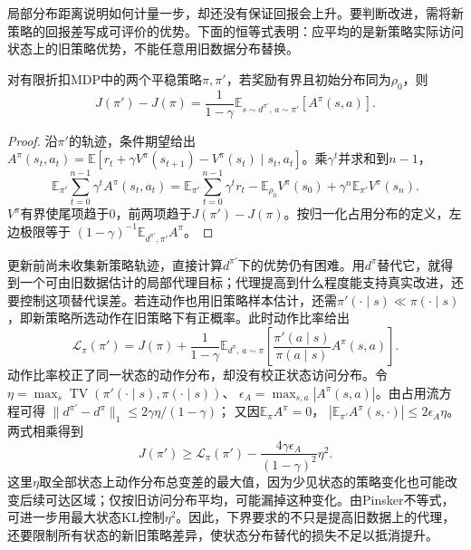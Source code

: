 局部分布距离说明如何计量一步，却还没有保证回报会上升。要判断改进，需将新策略的回报差写成可评价的优势。下面的恒等式表明：应平均的是新策略实际访问状态上的旧策略优势，不能任意用旧数据分布替换。

\begin{theorem}[折扣性能差恒等式]
  \label{thm:rl-learning-performance-difference}
  对有限折扣MDP中的两个平稳策略$\pi,\pi'$，若奖励有界且初始分布同为$\rho_0$，则
  \begin{equation}
    J(\pi')-J(\pi)
       =\frac{1}{1-\gamma}
          \mathbb E_{s\sim d^{\pi'},\,a\sim\pi'}[A^\pi(s,a)].
    \label{eq:rl-learning-performance-difference}
  \end{equation}
\end{theorem}
\begin{proof}
  沿$\pi'$的轨迹，条件期望给出
  $A^\pi(s_t,a_t)
    =\mathbb E[r_t+\gamma V^\pi(s_{t+1})-V^\pi(s_t)
                \mid s_t,a_t]$。乘$\gamma^t$并求和到$n-1$，
  \[
    \mathbb E_{\pi'}\sum_{t=0}^{n-1}\gamma^t A^\pi(s_t,a_t)
      =\mathbb E_{\pi'}\sum_{t=0}^{n-1}\gamma^t r_t
         -\mathbb E_{\rho_0}V^\pi(s_0)
         +\gamma^n\mathbb E_{\pi'}V^\pi(s_n).
  \]
  $V^\pi$有界使尾项趋于0，前两项趋于$J(\pi')-J(\pi)$。按归一化占用分布的定义，左边极限等于
  $(1-\gamma)^{-1}\mathbb E_{d^{\pi'},\pi'}A^\pi$。
\end{proof}

更新前尚未收集新策略轨迹，直接计算$d^{\pi'}$下的优势仍有困难。用$d^\pi$替代它，就得到一个可由旧数据估计的局部代理目标；代理提高到什么程度能支持真实改进，还要控制这项替代误差。若连动作也用旧策略样本估计，还需$\pi'(\cdot\mid s)\ll\pi(\cdot\mid s)$，即新策略所选动作在旧策略下有正概率。此时动作比率给出
\[
  \mathcal L_\pi(\pi')
    =J(\pi)+\frac1{1-\gamma}
         \mathbb E_{d^\pi,\,a\sim\pi}
           \left[\frac{\pi'(a\mid s)}{\pi(a\mid s)}
                         A^\pi(s,a)\right].
\]
动作比率校正了同一状态的动作分布，却没有校正状态访问分布。令
$\eta=\max_s\operatorname{TV}(\pi'(\cdot\mid s),\pi(\cdot\mid s))$、
$\epsilon_A=\max_{s,a}|A^\pi(s,a)|$。由占用流方程可得
$\lVert d^{\pi'}-d^\pi\rVert_1\leq2\gamma\eta/(1-\gamma)$；
又因$\mathbb E_\pi A^\pi=0$，
$|\mathbb E_{\pi'}A^\pi(s,\cdot)|\leq2\epsilon_A\eta$。两式相乘得到
\begin{equation}
  J(\pi')\geq\mathcal L_\pi(\pi')
       -\frac{4\gamma\epsilon_A}{(1-\gamma)^2}\eta^2 .
  \label{eq:rl-learning-trpo-bound}
\end{equation}
这里$\eta$取全部状态上动作分布总变差的最大值，因为少见状态的策略变化也可能改变后续可达区域；仅按旧访问分布平均，可能漏掉这种变化。由Pinsker不等式，可进一步用最大状态KL控制$\eta^2$。因此，下界要求的不只是提高旧数据上的代理，还要限制所有状态的新旧策略差异，使状态分布替代的损失不足以抵消提升。

